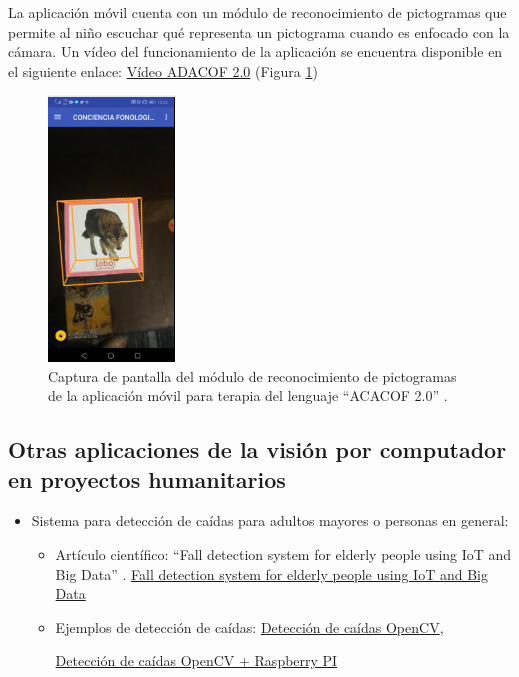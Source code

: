 \documentclass[a4paper,10pt]{article}
\begin{document}
La aplicación móvil cuenta con un módulo de reconocimiento de pictogramas que permite al niño escuchar qué representa un pictograma cuando es enfocado con la cámara. Un vídeo del funcionamiento de la aplicación se encuentra disponible en el siguiente enlace: \href{https://github.com/vlarobbyk/LaTeX/blob/master/images/Pictogram-Recognizer-SLT-JGonzalez-VRobles.mp4}{Vídeo ADACOF 2.0} (Figura \ref{Fig:ReconocimientoPictogramasADACOF2.0})


\begin{figure}[th!]
	\centering
	\includegraphics[width = 0.3\textwidth]{images/ReconocimientoPictogramasADACOF20.png}
	\caption{Captura de pantalla del módulo de reconocimiento de pictogramas de la aplicación móvil para terapia del lenguaje ``ACACOF 2.0'' \cite{gonzalez2019}.}
	\label{Fig:ReconocimientoPictogramasADACOF2.0}
\end{figure}


\subsection{Otras aplicaciones de la visión por computador en proyectos humanitarios}

\begin{itemize}
	\item Sistema para detección de caídas para adultos mayores o personas en general:
	\begin{itemize}
		\item Artículo científico: ``Fall detection system for elderly people using IoT and Big Data'' \cite{yacchirema2018fall}. \href{https://www.sciencedirect.com/science/article/pii/S1877050918304721}{Fall detection system for elderly people using IoT and Big Data}
		\item Ejemplos de detección de caídas:
		\href{https://www.youtube.com/watch?v=V1QRF4OhtHo}{Detección de caídas OpenCV}, 
		
		\href{https://www.youtube.com/watch?v=eXMYZedp0Uo}{Detección de caídas OpenCV + Raspberry PI}
	\end{itemize}
\end{itemize}
\end{document}
